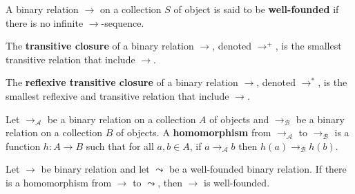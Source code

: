 \begin{definition}
    \label{def:binary_relation:well_founded}
    A binary relation $\to$ on a collection $S$ of object is said to be \textbf{well-founded} if there is no infinite $\to$-sequence. 
\end{definition}

\begin{definition}
    \label{def:binary_relation:transitive_closure}
    The \textbf{transitive closure} of a binary relation $\to$, denoted $\to^+$, is the smallest transitive relation that include \( \mathop{\to} \).
  \end{definition}
  
  \begin{definition}
    \label{def:binary_relation:reflexive_transitive_closure}
    The \textbf{reflexive transitive closure} of a binary relation $\to$, denoted $\to^*$, is the smallest reflexive and transitive relation that include \( \mathop{\to} \).
  \end{definition}

  \begin{definition}
    \label{def:binary_relation:homomorphism}
    Let $\to_\mathcal{A}$ be a binary relation on a collection $A$ of objects and $\to_\mathcal{B}$ be a binary relation on a collection $B$ of objects. A \textbf{homomorphism} from $\to_\mathcal{A}$ to $\to_\mathcal{B}$ is a function \( h: A \mathop{\to} B \) such that for all \( a, b \mathop{\in} A \), if \( a \mathop{\to} _\mathcal{A} b \) then \( h(a) \mathop{\to} _\mathcal{B} h(b) \).
  \end{definition}
  
\begin{proposition}
  \label{prop:binary_relation:proving_well_foundedness}
  Let \(\to\) be binary relation and let $\leadsto$ be a well-founded binary relation. If there is a homomorphism from \(\to\) to \(\leadsto\), then \(\to\) is well-founded.
\end{proposition}